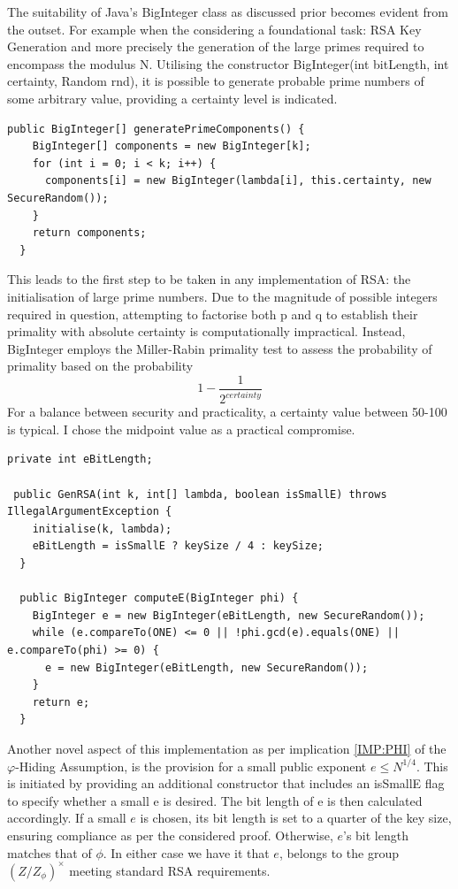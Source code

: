 \documentclass[]{final_report}
\theoremstyle{definition}
\begin{document}
The suitability of Java's BigInteger class as discussed prior becomes evident from the outset. For example when the considering a foundational task: RSA Key Generation and more precisely the generation of the large primes required to encompass the modulus N.
Utilising the constructor BigInteger(int bitLength, int certainty, Random rnd), it is possible to generate probable prime numbers of some arbitrary value, providing a certainty level is indicated.
\begin{lstlisting}[caption=Parametrisable Prime Generation with BigInteger]
public BigInteger[] generatePrimeComponents() {
    BigInteger[] components = new BigInteger[k];
    for (int i = 0; i < k; i++) {
      components[i] = new BigInteger(lambda[i], this.certainty, new SecureRandom());
    }
    return components;
  }
\end{lstlisting}
This leads to the first step to be taken in any implementation of RSA: the initialisation of large prime numbers. 
Due to the magnitude of possible integers required in question, attempting to factorise both p and q to establish their primality with absolute certainty is computationally impractical. Instead, BigInteger employs the Miller-Rabin primality test to assess the probability of primality based on the probability  \[ 1 - \frac{1}{2^{certainty}}\]
For a balance between security and practicality, a certainty value between 50-100 is typical. I chose the midpoint value as a practical compromise.


\begin{lstlisting}[caption= Adaptation for specification of small e]
 private int eBitLength;
 
 public GenRSA(int k, int[] lambda, boolean isSmallE) throws IllegalArgumentException {
    initialise(k, lambda);
    eBitLength = isSmallE ? keySize / 4 : keySize;
  }
  
  public BigInteger computeE(BigInteger phi) {
    BigInteger e = new BigInteger(eBitLength, new SecureRandom());
    while (e.compareTo(ONE) <= 0 || !phi.gcd(e).equals(ONE) || e.compareTo(phi) >= 0) {
      e = new BigInteger(eBitLength, new SecureRandom());
    }
    return e;
  }
\end{lstlisting}

Another novel aspect of this implementation as per implication \ref{IMP:PHI} of the $\varphi$-Hiding Assumption, is the provision for a small public exponent \( e \leqslant N^{1/4} \). This is initiated by providing an additional constructor that includes an isSmallE flag to specify whether a small e is desired. The bit length of e is then calculated accordingly.  If a small \( e \) is chosen, its bit length is set to a quarter of the key size, ensuring compliance as per the considered proof. Otherwise, \( e \)'s bit length matches that of \( \phi \). In either case we have it that \( e \), belongs to the group \( (Z/ Z_{\phi})^{\times} \) meeting standard RSA requirements.
\end{document}

